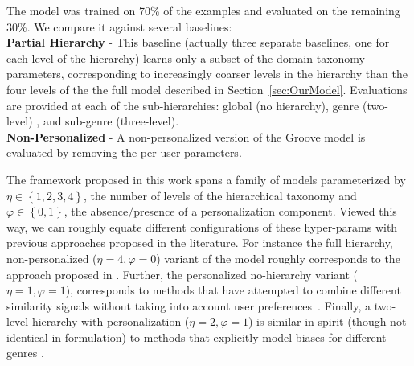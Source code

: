 
The model was trained on 70\% of the examples and evaluated on the remaining 30\%. 
We compare it against several baselines:\\
{\bf Partial Hierarchy} - This baseline (actually three separate baselines, one for each level of the hierarchy)  learns only a subset of the domain taxonomy parameters, corresponding to increasingly coarser levels in the hierarchy than the four levels of the the full model described in Section~\ref{sec:OurModel}. Evaluations are provided at each of the sub-hierarchies: global (no hierarchy), genre (two-level) , and sub-genre (three-level).\\
{\bf Non-Personalized} - A non-personalized version of the Groove model is evaluated by removing the per-user parameters.\\ %

 The framework proposed in this work spans a family of models parameterized by $\eta\in\left\{1,2,3,4\right\}$, the number of levels of the hierarchical taxonomy and $\varphi\in\left\{0,1\right\}$, the absence/presence of a personalization component. Viewed this way, we can roughly equate different configurations of these hyper-params with previous approaches proposed in the literature. For instance the full hierarchy, non-personalized ($\eta=4,\varphi=0$) variant of the model roughly corresponds to the approach proposed in \cite{NIPS2012_4609}. Further, the personalized no-hierarchy variant ($\eta=1,\varphi=1$), corresponds to methods that have attempted to combine different similarity signals without taking into account user preferences~\cite{Knees:2006,McFee_multi_similarities}. Finally, a two-level hierarchy with personalization  ($\eta=2,\varphi=1$) is similar in spirit (though not identical in formulation) to methods that explicitly model biases for different genres \cite{Dror2011,Mnih2012}.

